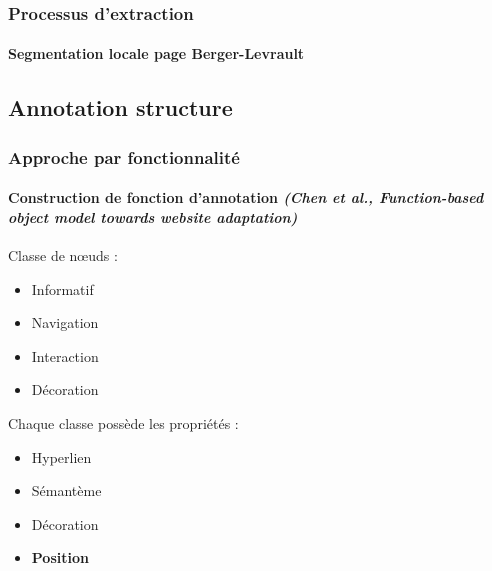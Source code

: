 \documentclass[9pt]{beamer}
\begin{document}
\begin{frame}
	\frametitle{Processus d'extraction}
	\framesubtitle{Segmentation locale page Berger-Levrault}

		\vspace{1cm}

\end{frame}

\subsection{Annotation structure}
\begin{frame}
\frametitle{Approche par fonctionnalité}
\framesubtitle{Construction de fonction d'annotation \textit{(Chen et al., Function-based object model towards website adaptation)}}
\begin{block}{}
Classe de n\oe{}uds :
\begin{itemize}
	\item Informatif
	\item Navigation
	\item Interaction
	\item Décoration
\end{itemize}
Chaque classe possède les propriétés : 
\begin{itemize}
\item Hyperlien
\item Sémantème
\item Décoration
\item \textbf{Position}
\end{itemize}
\end{block}

\end{frame}

\end{document}
